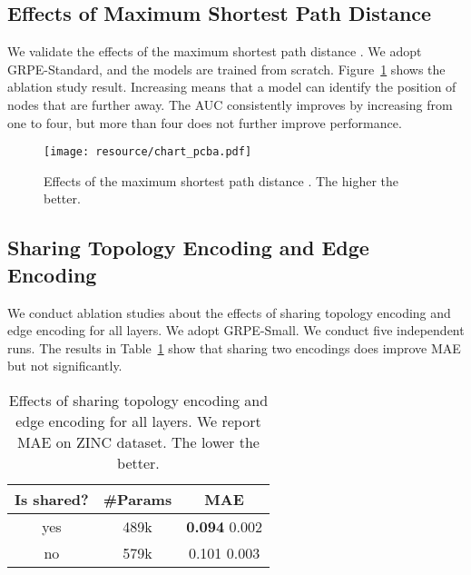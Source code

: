 \documentclass[letterpaper]{article} \usepackage{aaai23}  \usepackage{times}  \usepackage{helvet}  \usepackage{courier}  \usepackage[hyphens]{url}  \usepackage{graphicx} \urlstyle{rm} \def\UrlFont{\rm}  \usepackage{natbib}  \usepackage{caption} \frenchspacing  \setlength{\pdfpagewidth}{8.5in} \setlength{\pdfpageheight}{11in} \usepackage{algorithm}
\begin{document}
%
 


\subsection{Effects of Maximum Shortest Path Distance }

We validate the effects of the maximum shortest path distance .
We adopt GRPE-Standard, and the models are trained from scratch.
Figure~\ref{fig:abl_shortest} shows the ablation study result.
Increasing  means that a model can identify the position of nodes that are further away.
The AUC consistently improves by increasing  from one to four, but  more than four does not further improve performance. 


\begin{figure}
\begin{minipage}{0.49\textwidth}
\centering
\texttt{[image: resource/chart\_pcba.pdf]}
\caption{Effects of the maximum shortest path distance . The higher the better.}
\label{fig:abl_shortest}
\end{minipage}
\hfill
\end{figure}

\subsection{Sharing Topology Encoding and Edge Encoding}

We conduct ablation studies about the effects of sharing topology encoding  and edge encoding  for all layers. 
We adopt GRPE-Small.
We conduct five independent runs.
The results in Table~\ref{tab:abl_sharing} show that sharing two encodings does improve MAE but not significantly.



\begin{table}
\caption{Effects of sharing topology encoding and edge encoding for all layers. We report MAE on ZINC dataset. The lower the better.}
\centering
\vspace{-0.2cm}
\begin{tabular}{ccc}
\toprule
\multicolumn{1}{c|}{Is shared?} & \multicolumn{1}{c|}{\#Params} & MAE \\ \hline
\multicolumn{1}{c|}{yes}  & \multicolumn{1}{c|}{489k} & 
\multicolumn{1}{c}{\textbf{0.094} 0.002}\\
\multicolumn{1}{c|}{no}  & \multicolumn{1}{c|}{579k} & 
\multicolumn{1}{c}{0.101  0.003} \\
 
\bottomrule
\end{tabular}
\label{tab:abl_sharing}
\end{table} 
\end{document}
